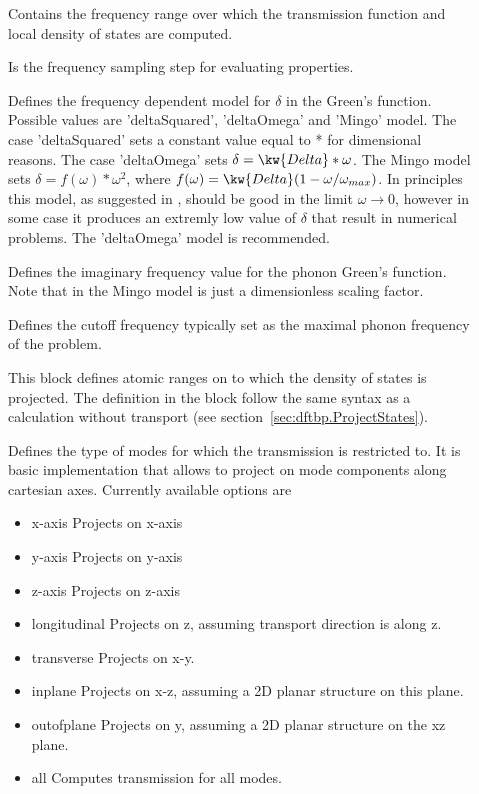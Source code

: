 \begin{description}
\item[] Contains the frequency range over
  which the transmission function and local density of states are computed.
\item[] Is the frequency sampling step for
  evaluating properties.
\item[] Defines the frequency dependent model for $\delta$ in the
	Green's function. Possible values are 'deltaSquared', 'deltaOmega' and 
	'Mingo' model. 
    The case 'deltaSquared' sets a constant value equal to *
    for dimensional reasons.
    The case 'deltaOmega' sets $\delta= \kw{Delta}* \omega$.
    The Mingo model sets $\delta=f(\omega)*\omega^2$, where 
    $f(\omega)=\kw{Delta}(1-\omega/\omega_{max})$. In principles this model, as
    suggested in \cite{Mingo}, should be good in the limit $\omega \rightarrow 0$, however
    in some case it produces an extremly low value of $\delta$ that result in 
    numerical problems. The 'deltaOmega' model is recommended.
\item[] Defines the imaginary frequency value 
	for the phonon Green's function. Note that in the Mingo model  
	is just a dimensionless scaling factor.
\item[] Defines the cutoff frequency typically 
	set as the maximal phonon frequency of the problem.
\item[] \label{pRegion} This block defines atomic ranges on to which the  
	density of states is projected. 
	The definition in the block follow the same syntax as a \dftbp{} calculation without 
	transport (see section~\ref{sec:dftbp.ProjectStates}).
\item[] Defines the type of modes for which the transmission is restricted to.
	It is basic implementation that allows to project on mode components along 
	cartesian axes. Currently available options are\\
	\begin{itemize}
	  \item{x-axis} Projects on x-axis 
        \item{y-axis} Projects on y-axis 
        \item{z-axis} Projects on z-axis
        \item{longitudinal} Projects on z, assuming transport direction is along z.
        \item{transverse} Projects on x-y.
        \item{inplane} Projects on x-z, assuming a 2D planar structure on this plane.
        \item{outofplane} Projects on y, assuming a 2D planar structure on the xz plane.
        \item{all} Computes transmission for all modes.
      \end{itemize}
\end{description}

